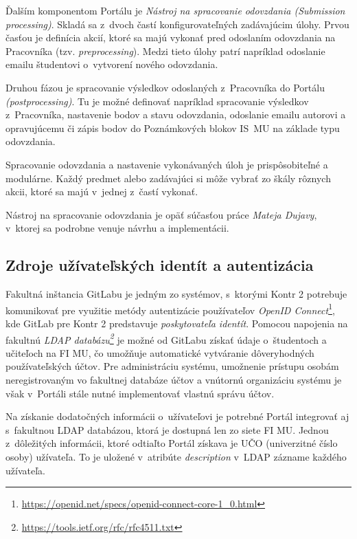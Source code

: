 \documentclass[
  digital, %
  oneside, %
  table,   %
  lof,     %
  lot,   %
]{fithesis3}
\newcommand*{\footurl}[1]{\footnote{\url{#1}}}
\begin{document}
Ďalším komponentom Portálu je \emph{Nástroj na spracovanie odovzdania (Submission processing)}. Skladá sa z~dvoch častí konfigurovateľných zadávajúcim úlohy. Prvou časťou je definícia akcií, ktoré sa majú vykonať pred odoslaním odovzdania na Pracovníka (tzv. \emph{preprocessing}). Medzi tieto úlohy patrí napríklad odoslanie emailu študentovi o~vytvorení nového odovzdania.

Druhou fázou je spracovanie výsledkov odoslaných z~Pracovníka do Portálu \emph{(postprocessing)}. Tu je možné definovať napríklad spracovanie výsledkov z~Pracovníka, nastavenie bodov a stavu odovzdania, odoslanie emailu autorovi a opravujúcemu či zápis bodov do Poznámkových blokov IS~MU na základe typu odovzdania. 

Spracovanie odovzdania a nastavenie vykonávaných úloh je prispôsobiteľné a modulárne. Každý predmet alebo zadávajúci si môže vybrať zo škály rôznych akcii, ktoré sa majú v~jednej z~častí vykonať.

Nástroj na spracovanie odovzdania je opäť súčasťou práce \emph{Mateja Dujavy}\cite{kontr-scheduler}, v~ktorej sa podrobne venuje návrhu a implementácii.

\subsection{Zdroje užívateľských identít a autentizácia}

Fakultná inštancia GitLabu je jedným zo systémov, s~ktorými Kontr 2 potrebuje komunikovať pre využitie metódy autentizácie používateľov \emph{OpenID Connect}\footnote{\url{https://openid.net/specs/openid-connect-core-1_0.html}}, kde GitLab pre Kontr 2 predstavuje \emph{poskytovateľa identít}. Pomocou napojenia na fakultnú \emph{LDAP databázu\footurl{https://tools.ietf.org/rfc/rfc4511.txt}} je možné od GitLabu získať údaje o~študentoch a učiteľoch na FI MU, čo umožňuje automatické vytváranie dôveryhodných používateľských účtov. Pre administráciu systému, umožnenie prístupu osobám neregistrovaným vo fakultnej databáze účtov a vnútornú organizáciu systému je však v~Portáli stále nutné implementovať vlastnú správu účtov. 

Na získanie dodatočných informácii o~užívateľovi je potrebné Portál integrovať aj s~fakultnou LDAP databázou, ktorá je dostupná len zo siete FI MU. Jednou z~dôležitých informácii, ktoré odtiaľto Portál získava je UČO (univerzitné číslo osoby) užívateľa. To je uložené v~atribúte \emph{description} v~LDAP zázname každého užívateľa.
\end{document}

